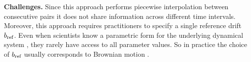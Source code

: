 \textbf{Challenges.} Since this approach performs piecewise interpolation between consecutive pairs 
it does not share information across different time intervals. Moreover, this approach requires  practitioners to specify a single reference drift $\refdrift$. Even when scientists know a parametric form for the underlying dynamical system \citep[e.g.,][for mRNA dynamics]{pratapa2020benchmarking}, they rarely have access to all parameter values. So in practice the choice of $\refdrift$ usually corresponds to Brownian motion \citep{Caluya2022, Vargas2021,Chen2022, chen2019multi, chen2024deep}.





